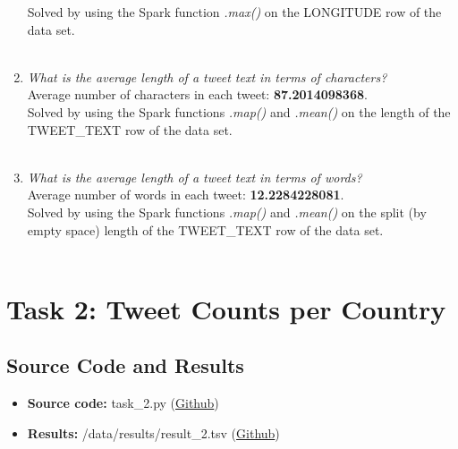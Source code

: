 \documentclass{article}
\begin{document}
\begin{enumerate}[label=\alph*)]
    Solved by using the Spark function \textit{.max()} on the LONGITUDE row of the data set.\\ \\
    
    
    \item \textit{ What is the average length of a tweet text in terms of characters?}\\
    
    Average number of characters in each tweet: \textbf{87.2014098368}.\\
    
    Solved by using the Spark functions \textit{.map()} and \textit{.mean()} on the length of the TWEET\_TEXT row of the data set.\\ \\
    
    
    \item \textit{What is the average length of a tweet text in terms of words?}\\
    
    Average number of words in each tweet: \textbf{12.2284228081}.\\
    
    Solved by using the Spark functions \textit{.map()} and \textit{.mean()} on the split (by empty space) length of the TWEET\_TEXT row of the data set.\\ \\
\end{enumerate}


\section*{Task 2: Tweet Counts per Country}
\subsection*{Source Code and Results}
    \begin{itemize}
        \item \textbf{Source code:} task\_2.py (\href{https://github.com/FredrikBakken/TDT4305_Big-Data-Project/blob/master/PhaseOne/task_2.py}{Github})
        \item \textbf{Results:} /data/results/result\_2.tsv (\href{https://github.com/FredrikBakken/TDT4305_Big-Data-Project/blob/master/PhaseOne/data/results/result_2.tsv}{Github})
    \end{itemize}
\end{document}
